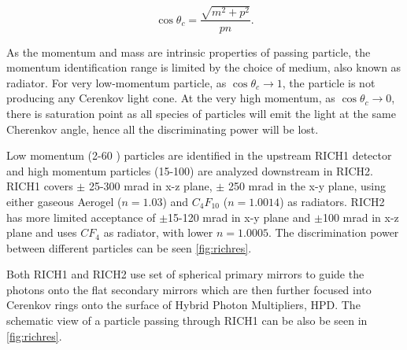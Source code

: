 \begin{equation}
	\cos\theta_{c} =  \frac{\sqrt{m^{2} + p^{2}}}{pn}.
\end{equation}

As the momentum and mass are intrinsic properties of passing particle, the momentum identification range is limited by the choice of medium, also known as radiator. For very low-momentum particle, as $\cos\theta_{c} \rightarrow 1$, the particle is not producing any Cerenkov light cone. At the very high momentum, as $\cos\theta_{c} \rightarrow 0$, there is saturation point as all species of particles will emit the light at the same Cherenkov angle, hence all the discriminating power will be lost.

Low momentum (2-60 \gev) particles are identified in the upstream RICH1 detector and high momentum particles (15-100) \gev are analyzed downstream in RICH2. RICH1 covers $\pm$ 25-300 mrad in x-z plane, $\pm$ 250 mrad in the x-y plane, using either gaseous Aerogel ($n=1.03$) and $C_{4}F_{10}$ ($n = 1.0014$) as radiators. RICH2 has more limited acceptance of $\pm$15-120 mrad in x-y plane and $\pm$100 mrad in x-z plane and uses $CF_{4}$ as radiator, with lower $n=1.0005$. The discrimination power between different particles can be seen \autoref{fig:richres}. 


Both RICH1 and RICH2 use set of spherical primary mirrors to guide the photons onto the flat secondary mirrors which are then further focused into Cerenkov rings onto the surface of Hybrid Photon Multipliers, \Gls{HPD}. The schematic view of a particle passing through RICH1 can be also be seen in \autoref{fig:richres}. 


